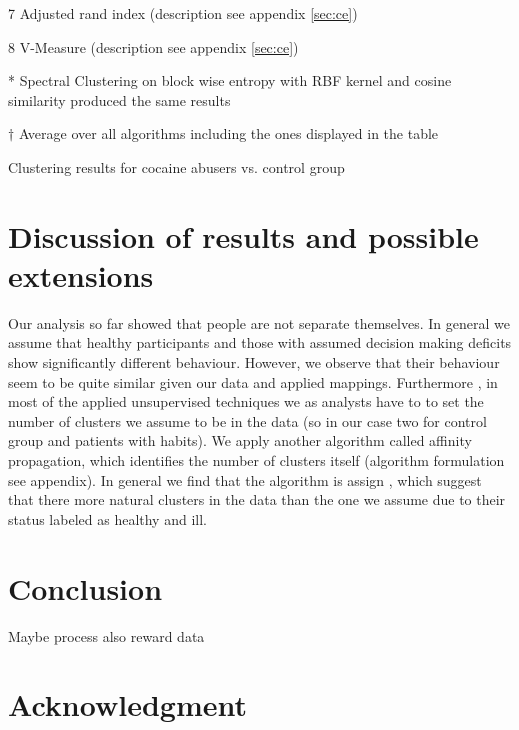 \documentclass[12pt,a4paper,bibliography=totocnumbered,listof=totocnumbered]{scrartcl}
\begin{document}
{\begin{threeparttable}[H]
\begin{tcolorbox}[arc=0mm,title=Notes,boxrule=0.2mm,colbacktitle=white,coltitle=black,colback=white,top=0mm,bottom=0.1mm]
\begin{tablenotes}
	        \item[7] Adjusted rand index (description see appendix \ref{sec:ce})
	        \item[8] V-Measure (description see appendix \ref{sec:ce})
	        \item[*] Spectral Clustering on block wise entropy with RBF kernel and cosine similarity produced the same results
	        \item[$\dagger$] Average over all algorithms including the ones displayed in the table
	\end{tablenotes}
	\end{tcolorbox}
	\caption{Clustering results for cocaine abusers vs. control group} 
	\label{tab:cocainresults}
 \end{threeparttable} 

\section{Discussion of results and possible extensions }

Our analysis so far showed that people are not separate themselves. In general we assume that healthy participants and those with assumed decision making deficits show significantly different behaviour. However, we observe that their behaviour seem to be quite similar given our data and applied mappings. Furthermore , in most of the applied unsupervised techniques we as analysts have to to set the number of clusters we assume to be in the data (so in our case two for control group and patients with habits). We apply another algorithm called affinity propagation, which identifies the number of clusters itself (algorithm formulation see appendix). In general we find that the algorithm is assign , which suggest that there more natural clusters in the data than the  one we assume due to their status labeled as healthy and ill.


\section{Conclusion}

Maybe process also reward data 


\section{Acknowledgment}




}
\end{document}
